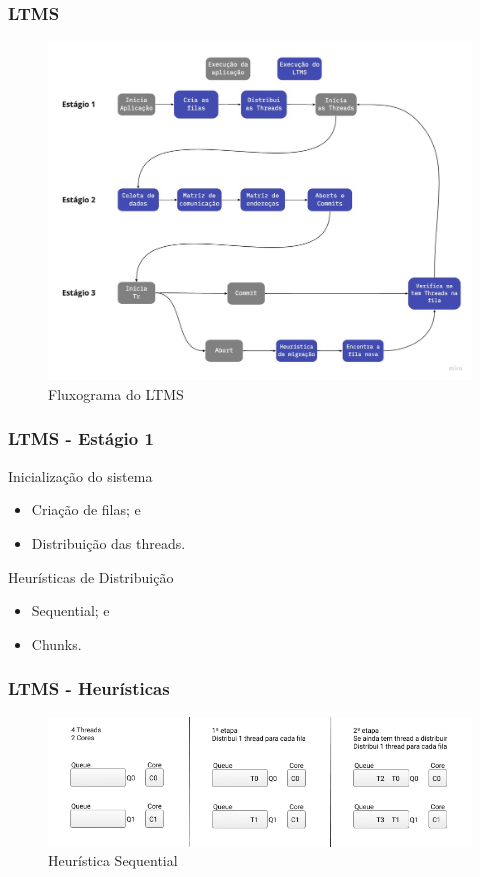 \documentclass[10pt, pdf,xcolor=pdftex,dvipsnames,table]{beamer}
\begin{document}
\begin{frame} \frametitle{LTMS}
    \begin{figure}[!h]
        \centering
        \includegraphics[scale=0.2]{images/LTMS}
        \caption{Fluxograma do LTMS}
        \label{fig:abusy}
    \end{figure}
\end{frame}

\begin{frame} \frametitle{LTMS - Estágio 1}
    \begin{block}{Inicialização do sistema}
        \begin{itemize}
        	\item Criação de filas; e
        	\item Distribuição das threads.
        \end{itemize}
    \end{block}

    \begin{block}{Heurísticas de Distribuição}
        \begin{itemize}
        	\item Sequential; e
        	\item Chunks.
        \end{itemize}
    \end{block}
\end{frame}

\begin{frame} \frametitle{LTMS - Heurísticas}
    \begin{figure}[!h]
        \includegraphics[scale=0.4]{images/Queue_one}
        \caption{Heurística Sequential}
        \label{fig:abusy}
    \end{figure}
\end{frame}
\end{document}
